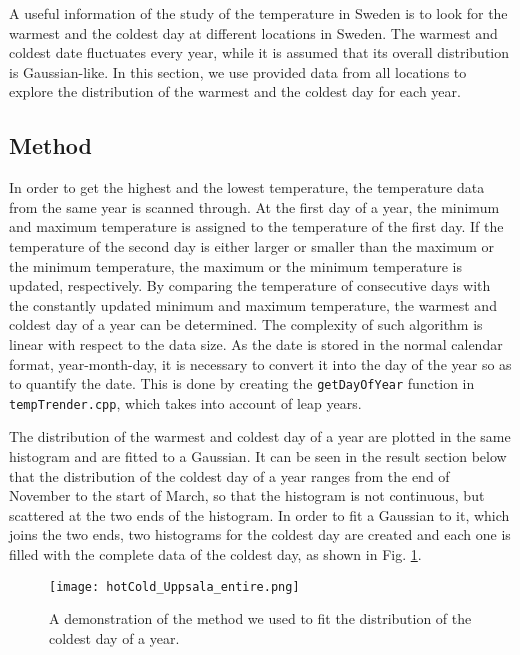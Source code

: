 

A useful information of the study of the temperature in Sweden is to look for the warmest and the coldest day at different locations in Sweden. The warmest and coldest date fluctuates every year, while it is assumed that its overall distribution is Gaussian-like. In this section, we use provided data from all locations to explore the distribution of the warmest and the coldest day for each year. 

\subsection{Method}
In order to get the highest and the lowest temperature, the temperature data from the same year is scanned through. At the first day of a year, the minimum and maximum temperature is assigned to the temperature of the first day. If the temperature of the second day is either larger or smaller than the maximum or the minimum temperature, the maximum or the minimum temperature is updated, respectively. By comparing the temperature of consecutive days with the constantly updated minimum and maximum temperature, the warmest and coldest day of a year can be determined. The complexity of such algorithm is linear with respect to the data size. As the date is stored in the normal calendar format, year-month-day, it is necessary to convert it into the day of the year so as to quantify the date. This is done by creating the \texttt{getDayOfYear} function in \texttt{tempTrender.cpp}, which takes into account of leap years.  

The distribution of the warmest and coldest day of a year are plotted in the same histogram and are fitted to a Gaussian. It can be seen in the result section below that the distribution of the coldest day of a year ranges from the end of November to the start of March, so that the histogram is not continuous, but scattered at the two ends of the histogram. In order to fit a Gaussian to it, which joins the two ends, two histograms for the coldest day are created and each one is filled with the complete data of the coldest day, as shown in Fig. \ref{hotColdUppsalaFit}.
\begin{figure}[H]
\centering
\texttt{[image: hotCold\_Uppsala\_entire.png]}
\caption{A demonstration of the method we used to fit the distribution of the coldest day of a year. }
\label{hotColdUppsalaFit}
\end{figure}

